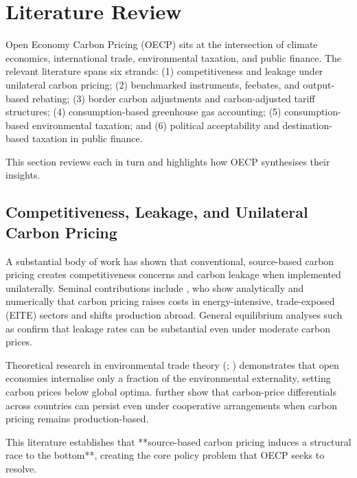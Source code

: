 \documentclass[12pt]{article}
\begin{document}
\section{Literature Review}

Open Economy Carbon Pricing (OECP) sits at the intersection of climate economics,
international trade, environmental taxation, and public finance.  
The relevant literature spans six strands:
(1) competitiveness and leakage under unilateral carbon pricing;  
(2) benchmarked instruments, feebates, and output-based rebating;  
(3) border carbon adjustments and carbon-adjusted tariff structures;  
(4) consumption-based greenhouse gas accounting;  
(5) consumption-based environmental taxation;  
and (6) political acceptability and destination-based taxation in public finance.  

This section reviews each in turn and highlights how OECP synthesises their insights.

\subsection{Competitiveness, Leakage, and Unilateral Carbon Pricing}

A substantial body of work has shown that conventional, source-based carbon pricing
creates competitiveness concerns and carbon leakage when implemented unilaterally.
Seminal contributions include \textcite{FischerFox2007, FischerFox2012},  
who show analytically and numerically that carbon pricing raises costs in  
energy-intensive, trade-exposed (EITE) sectors and shifts production abroad.  
General equilibrium analyses such as \textcite{BoehringerRutherford2016}  
confirm that leakage rates can be substantial even under moderate carbon prices.

Theoretical research in environmental trade theory  
(\textcite{Hoel1996}; \textcite{CopelandTaylor2005})  
demonstrates that open economies internalise only a fraction of the environmental  
externality, setting carbon prices below global optima.  
\textcite{AldyPizer2015} further show that carbon-price differentials across  
countries can persist even under cooperative arrangements when carbon pricing  
remains production-based.

This literature establishes that **source-based carbon pricing induces a structural 
race to the bottom**, creating the core policy problem that OECP seeks to resolve.
\end{document}
